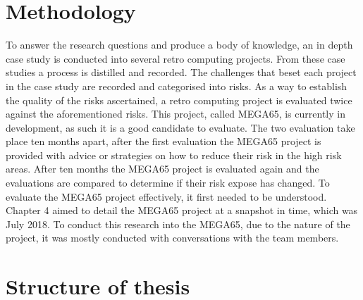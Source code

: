 \section{Methodology}
To answer the research questions and produce a body of knowledge, an in depth case study is conducted into several retro computing projects. From these case studies a process is distilled and recorded. The challenges that beset each project in the case study are recorded and categorised into risks. As a way to establish the quality of the risks ascertained, a retro computing project is evaluated twice against the aforementioned risks. This project, called MEGA65, is currently in development, as such it is a good candidate to evaluate. The two evaluation take place ten months apart, after the first evaluation the MEGA65 project is provided with advice or strategies on how to reduce their risk in the high risk areas. After ten months the MEGA65 project is evaluated again and the evaluations are compared to determine if their risk expose has changed. To evaluate the MEGA65 project effectively, it first needed to be understood. Chapter 4 aimed to detail the MEGA65 project at a snapshot in time, which was July 2018. To conduct this research into the MEGA65, due to the nature of the project, it was mostly conducted with conversations with the team members. 

\section{Structure of thesis}
